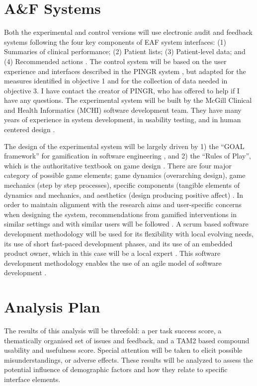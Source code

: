 \section{A\&F Systems}
Both the experimental and control versions will use electronic audit and feedback systems following the four key components of \gls{EAF} system interfaces: (1) Summaries of clinical performance; (2) Patient lists; (3) Patient-level data; and (4) Recommended actions \cite{brown2015meta}. The control system will be based on the user experience and interfaces described in the PINGR system \cite{brown2016interface}, but adapted for the measures identified in objective 1 and for the collection of data needed in objective 3. I have contact the creator of PINGR, who has offered to help if I have any questions. The experimental system will be built by the McGill Clinical and Health Informatics (MCHI) software development team. They have many years of experience in system development, in usability testing, and in human centered design \cite{shaban2017pophr, lavigne2013hybrid, buckeridge2016developing}.

The design of the experimental system will be largely driven by 1) the ``GOAL framework'' for gamification in software engineering \cite{garcia2017framework}, and 2) the ``Rules of Play'', which is  the authoritative textbook on game design \cite{salen2004rules}. There are four major category of possible game elements; game dynamics (overarching design), game mechanics (step by step processes), specific components (tangible elements of dynamics and mechanics, and aesthetics (design producing positive affect) \cite{mckeown2016gamification}. In order to maintain alignment with the research aims and user-specific concerns when designing the system, recommendations from gamified interventions in similar settings and with similar users will be followed \cite{mckeown2016gamification}. A scrum based software development methodology will be used for its flexibility with local evolving needs, its use of short fast-paced development phases, and its use of an embedded product owner, which in this case will be a local expert \cite{cohn2010succeeding}. This software development methodology enables the use of an agile model of software development \cite{beck2001manifesto}.

\section{Analysis Plan}
The results of this analysis will be threefold: a per task success score, a thematically organised set of issues and feedback, and a TAM2 based compound usability and usefulness score. Special attention will be taken to elicit possible misunderstandings, or adverse effects. These results will be analyzed to assess the potential influence of demographic factors and how they relate to specific interface elements.

